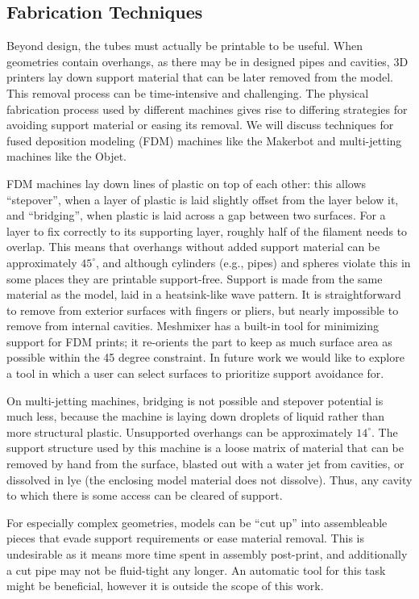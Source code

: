 \subsection{Fabrication Techniques}

Beyond design, the tubes must actually be printable to be useful.  When geometries contain overhangs, as there may be in designed pipes and cavities, 3D printers lay down support material that can be later removed from the model.  This removal process can be time-intensive and challenging.  The physical fabrication process used by different machines gives rise to differing strategies for avoiding support material or easing its removal.  We will discuss techniques for fused deposition modeling (FDM) machines like the Makerbot and multi-jetting machines like the Objet.

FDM machines lay down lines of plastic on top of each other: this allows ``stepover'', when a layer of plastic is laid slightly offset from the layer below it, and ``bridging'', when plastic is laid across a gap between two surfaces.  For a layer to fix correctly to its supporting layer, roughly half of the filament needs to overlap.  This means that overhangs without added support material can be approximately $45^{\circ}$, and although cylinders (e.g., pipes) and spheres violate this in some places they are printable support-free.  Support is made from the same material as the model, laid in a heatsink-like wave pattern.  It is straightforward to remove from exterior surfaces with fingers or pliers, but nearly impossible to remove from internal cavities.  Meshmixer has a built-in tool for minimizing support for FDM prints; it re-orients the part to keep as much surface area as possible within the 45 degree constraint.  In future work we would like to explore a tool in which a user can select surfaces to prioritize support avoidance for.  

On multi-jetting machines, bridging is not possible and stepover potential is much less, because the machine is laying down droplets of liquid rather than more structural plastic.  Unsupported overhangs can be approximately $14^{\circ}$.  The support structure used by this machine is a loose matrix of material that can be removed by hand from the surface, blasted out with a water jet from cavities, or dissolved in lye (the enclosing model material does not dissolve).  Thus, any cavity to which there is some access can be cleared of support.

For especially complex geometries, models can be ``cut up'' into assembleable pieces that evade support requirements or ease material removal.  This is undesirable as it means more time spent in assembly post-print, and additionally a cut pipe may not be fluid-tight any longer.  An automatic tool for this task might be beneficial, however it is outside the scope of this work.
